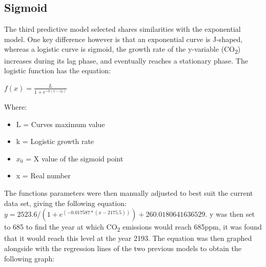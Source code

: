 \documentclass{mcmthesis}
\begin{document}
    \subsection{Sigmoid}
    The third predictive model selected shares similarities with the exponential model.
    One key difference however is that an exponential curve is J-shaped, whereas a logistic curve is sigmoid, the growth rate of the y-variable (CO\textsubscript{2}) increases during its lag phase, and eventually reaches a stationary phase.
    The logistic function has the equation:

    ${\displaystyle f(x)={\frac {L}{1+e^{-k(x-x_{0})}}}}$

    Where:
    \begin{itemize}
        \item {L} = Curve\textquotesingle s maximum value
        \item {k} = Logistic growth rate
        \item ${x_0}$ = X value of the sigmoid point
        \item {x} = Real number
    \end{itemize}

    The function\textquotesingle s parameters were then manually adjusted to best suit the current data set, giving the following equation: ${y = 2523.6 / (1 + e^{(-0.017587 * (x - 2175.5))}) + 260.0180641636529}$. {y} was then set to 685 to find the year at which CO\textsubscript{2} emissions would reach 685ppm, it was found that it would reach this level at the year 2193. The equation was then graphed alongside with the regression lines of the two previous models to obtain the following graph:
\end{document}
